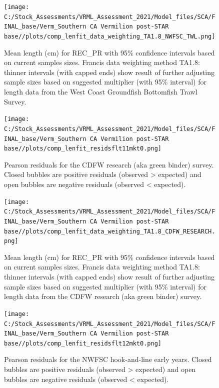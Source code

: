 \documentclass[11pt,
  english,
]{article}
\begin{document}
\begin{figure}
\centering
\texttt{[image: C:/Stock\_Assessments/VRML\_Assessment\_2021/Model\_files/SCA/FINAL\_base/Verm\_Southern CA Vermilion post-STAR base//plots/comp\_lenfit\_data\_weighting\_TA1.8\_NWFSC\_TWL.png]}
\caption{Mean length (cm) for REC\_PR with 95\% confidence intervals based on current samples sizes. Francis data weighting method TA1.8: thinner intervals (with capped ends) show result of further adjusting sample sizes based on suggested multiplier (with 95\% interval) for length data from the West Coast Groundfish Bottomfish Trawl Survey.\label{fig:mean-len-fit-NWFSC-TWL}}
\end{figure}

\begin{figure}
\centering
\texttt{[image: C:/Stock\_Assessments/VRML\_Assessment\_2021/Model\_files/SCA/FINAL\_base/Verm\_Southern CA Vermilion post-STAR base//plots/comp\_lenfit\_residsflt11mkt0.png]}
\caption{Pearson residuals for the CDFW research (aka green binder) survey. Closed bubbles are positive residuals (observed \textgreater{} expected) and open bubbles are negative residuals (observed \textless{} expected).\label{fig:len-pearson-CDFW-RESEARCH}}
\end{figure}

\begin{figure}
\centering
\texttt{[image: C:/Stock\_Assessments/VRML\_Assessment\_2021/Model\_files/SCA/FINAL\_base/Verm\_Southern CA Vermilion post-STAR base//plots/comp\_lenfit\_data\_weighting\_TA1.8\_CDFW\_RESEARCH.png]}
\caption{Mean length (cm) for REC\_PR with 95\% confidence intervals based on current samples sizes. Francis data weighting method TA1.8: thinner intervals (with capped ends) show result of further adjusting sample sizes based on suggested multiplier (with 95\% interval) for length data from the CDFW research (aka green binder) survey.\label{fig:mean-len-fit-CDFW-RESEARCH}}
\end{figure}

\begin{figure}
\centering
\texttt{[image: C:/Stock\_Assessments/VRML\_Assessment\_2021/Model\_files/SCA/FINAL\_base/Verm\_Southern CA Vermilion post-STAR base//plots/comp\_lenfit\_residsflt12mkt0.png]}
\caption{Pearson residuals for the NWFSC hook-and-line early years. Closed bubbles are positive residuals (observed \textgreater{} expected) and open bubbles are negative residuals (observed \textless{} expected).\label{fig:len-pearson-EARLY-HKL}}
\end{figure}
\end{document}
